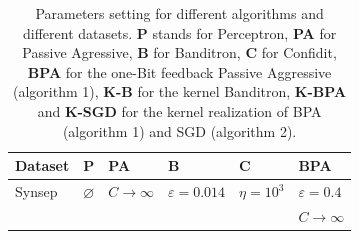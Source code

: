 \documentclass[preprint,12pt,authoryear]{elsarticle}
\begin{document}
\begin{table}[h]
	\caption{Parameters setting for different algorithms and different datasets.  {\bf P} stands for Perceptron, {\bf PA} for Passive Agressive, {\bf B} for Banditron, {\bf C} for Confidit, {\bf BPA} for the one-Bit feedback Passive Aggressive (algorithm 1), {\bf K-B} for the kernel Banditron, {\bf K-BPA} and {\bf K-SGD} for the kernel  realization of BPA (algorithm 1) and SGD (algorithm 2).}
	\label{table:bpa}
	
	\begin{center}
		\begin{tabular}{llllll}
			
			\hline
			{\bf Dataset}  & {\bf P} & {\bf PA } & {\bf B}& {\bf C} & {\bf BPA}\\
			\hline
			Synsep & $\varnothing$ & $C\rightarrow\infty$ & $\varepsilon = 0.014$ &$\eta = 10^3$ & $\varepsilon = 0.4$\\
			&&&&& $C \rightarrow \infty$\\
			

\end{tabular}
\end{center}
\end{table}
\end{document}
